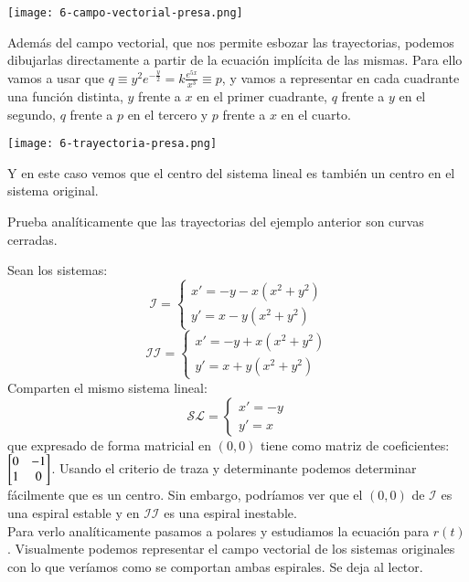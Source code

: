 \begin{eg}
    \begin{center}
        \texttt{[image: 6-campo-vectorial-presa.png]}
    \end{center}
    Además del campo vectorial, que nos permite esbozar las trayectorias, podemos dibujarlas directamente a partir de la ecuación implícita de las mismas. Para ello vamos a usar que $ q \equiv y^2 e^{-\frac{y}{2}} = k \frac{e^{5x}}{x^3} \equiv p$, y vamos a representar en cada cuadrante una función distinta, $y$ frente a $x$ en el primer cuadrante, $q$ frente a $y$ en el segundo, $q$ frente a $p$ en el tercero y $p$ frente a $x$ en el cuarto.
    \begin{center}
        \texttt{[image: 6-trayectoria-presa.png]}
    \end{center}
    Y en este caso vemos que el centro del sistema lineal es también un centro en el sistema original.
\end{eg}
\begin{th_ex}
    Prueba analíticamente que las trayectorias del ejemplo anterior son curvas cerradas.
\end{th_ex}
\begin{eg}\label{eg:centr-esp}
    Sean los sistemas:
    $$
        \mathcal{I} =
        \begin{cases}
                x' = -y -x(x^2 + y^2)\\
                y' = x  - y(x^2 + y^2)
        \end{cases}
    $$
    $$
        \mathcal{II} =
        \begin{cases}
                x' = -y + x(x^2 + y^2)\\
                y' = x  + y(x^2 + y^2)
        \end{cases}
    $$
    Comparten el mismo sistema lineal:
    $$
        \mathcal{SL} =
        \begin{cases}
                x' = -y\\
                y' = x
        \end{cases}
    $$
    que expresado de forma matricial en $(0, 0)$ tiene como matriz de coeficientes: $\mx{0 & -1 \\ 1 & 0}$. Usando el criterio de traza y determinante podemos determinar fácilmente que es un centro. Sin embargo, podríamos ver que el $(0,0)$ de $\mathcal{I}$ es una espiral estable y en $\mathcal{II}$ es una espiral inestable.\\
    Para verlo analíticamente pasamos a polares y estudiamos la ecuación para $r(t)$. Visualmente podemos representar el campo vectorial de los sistemas originales con lo que veríamos como se comportan ambas espirales. Se deja al lector.
\end{eg}
